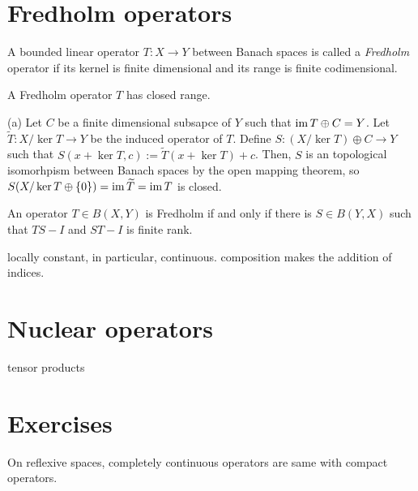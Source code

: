 \documentclass{../../large}
\begin{document}
\section{Fredholm operators}

\begin{prb}
A bounded linear operator $T:X\to Y$ between Banach spaces is called a \emph{Fredholm} operator if its kernel is finite dimensional and its range is finite codimensional.
\begin{parts}
\item A Fredholm operator $T$ has closed range.
\end{parts}
\end{prb}
\begin{pf}
(a)
Let $C$ be a finite dimensional subsapce of $Y$ such that $\operatorname{im} T\oplus C=Y$.
Let $\tilde T:X/\ker T\to Y$ be the induced operator of $T$.
Define $S:(X/\ker T)\oplus C\to Y$ such that $S(x+\ker T,c):=\tilde T(x+\ker T)+c$.
Then, $S$ is an topological isomorhpism between Banach spaces by the open mapping theorem, so $S(X/\ker T\oplus\{0\})=\operatorname{im}\widetilde T=\operatorname{im} T$ is closed.
\end{pf}

\begin{prb}
An operator $T\in B(X,Y)$ is Fredholm if and only if there is $S\in B(Y,X)$ such that $TS-I$ and $ST-I$ is finite rank.
\end{prb}

\begin{prb}
locally constant, in particular, continuous.
composition makes the addition of indices.
\end{prb}

\section{Nuclear operators}
tensor products





\section*{Exercises}

\begin{prb}
On reflexive spaces, completely continuous operators are same with compact operators.
\end{prb}
\end{document}
